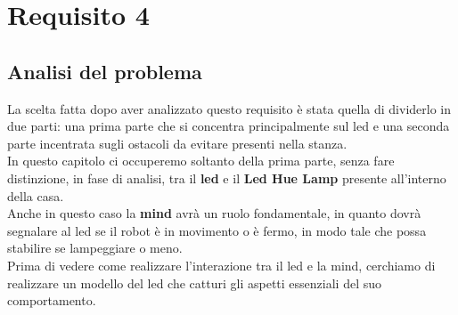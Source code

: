 \documentclass{llncs}
\begin{document}
\section{Requisito 4}
\label{Requisito4}
\subsection{Analisi del problema}
\label{AnalisidelproblemaReq4}
La scelta fatta dopo aver analizzato questo requisito \`e stata quella di dividerlo in due parti: una prima parte che si concentra principalmente sul led e una seconda parte incentrata sugli ostacoli da evitare presenti nella stanza.\\
In questo capitolo ci occuperemo soltanto della prima parte, senza fare distinzione, in fase di analisi, tra il \textbf{led} e il \textbf{Led Hue Lamp} presente all'interno della casa.\\
Anche in questo caso la \textbf{mind} avr\`a un ruolo fondamentale, in quanto dovr\`a segnalare al led se il robot \`e in movimento o \`e fermo, in modo tale che possa stabilire se lampeggiare o meno.\\
Prima di vedere come realizzare l'interazione tra il led e la mind, cerchiamo di realizzare un modello del led che catturi gli aspetti essenziali del suo comportamento.

\end{document}
